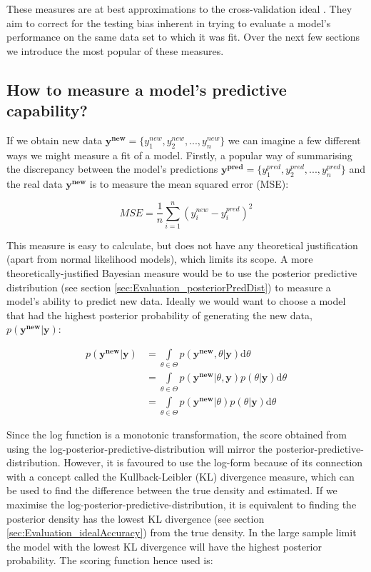 \documentclass[11pt,fullpage]{book}
\begin{document}
These measures are at best approximations to the cross-validation ideal \cite{gelman2014understanding}. They aim to correct for the testing bias inherent in trying to evaluate a model's performance on the same data set to which it was fit. Over the next few sections we introduce the most popular of these measures. 

\subsection{How to measure a model's predictive capability?}
If we obtain new data $\boldsymbol{y^{new}}=\{y^{new}_1,y^{new}_2,...,y^{new}_n\}$ we can imagine a few different ways we might measure a fit of a model. Firstly, a popular way of summarising the discrepancy between the model's predictions $\boldsymbol{y^{pred}}=\{y^{pred}_1,y^{pred}_2,...,y^{pred}_n\}$ and the real data $\boldsymbol{y^{new}}$ is to measure the mean squared error (MSE):

\begin{equation}
MSE = \frac{1}{n}\sum\limits_{i=1}^{n} (y^{new}_i-y^{pred}_i)^2
\end{equation}

This measure is easy to calculate, but does not have any theoretical justification (apart from normal likelihood models), which limits its scope. A more theoretically-justified Bayesian measure would be to use the posterior predictive distribution (see section \ref{sec:Evaluation_posteriorPredDist}) to measure a model's ability to predict new data. Ideally we would want to choose a model that had the highest posterior probability of generating the new data, $p(\boldsymbol{y^{new}}|\boldsymbol{y})$:

\begin{align}\label{eq:Evaluation_posteriorPredictiveDist}
p(\boldsymbol{y^{new}}|\boldsymbol{y}) &= \int\limits_{\theta\in\Theta} p(\boldsymbol{y^{new}},\theta|\boldsymbol{y})\mathrm{d}\theta\\
&= \int\limits_{\theta\in\Theta} p(\boldsymbol{y^{new}}|\theta,\boldsymbol{y})p(\theta|\boldsymbol{y})\mathrm{d}\theta\\
&= \int\limits_{\theta\in\Theta} p(\boldsymbol{y^{new}}|\theta)p(\theta|\boldsymbol{y})\mathrm{d}\theta
\end{align}


Since the log function is a monotonic transformation, the score obtained from using the log-posterior-predictive-distribution will mirror the posterior-predictive-distribution. However, it is favoured to use the log-form because of its connection with a concept called the Kullback-Leibler (KL) divergence measure, which can be used to find the difference between the true density and estimated. If we maximise the log-posterior-predictive-distribution, it is equivalent to finding the posterior density has the lowest KL divergence (see section \ref{sec:Evaluation_idealAccuracy}) from the true density. In the large sample limit the model with the lowest KL divergence will have the highest posterior probability. The scoring function hence used is: 
\end{document}
